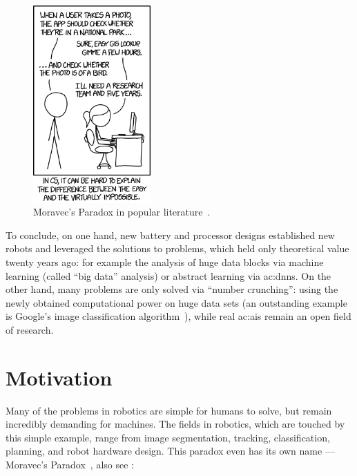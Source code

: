 \begin{figure}
  \centering
  \includegraphics[width=0.4\textwidth]{./figures/introduction/xkcd_tasks.png}
  \caption{Moravec’s Paradox in popular literature~\cite{munroe2018tasks}.}
  \label{fig:introduction_xkcdtasks}
\end{figure}

To conclude, on one hand, new battery and processor designs established new robots and leveraged the solutions to problems, which held only theoretical value twenty years ago: for example the analysis of huge data blocks via machine learning (called ``big data'' analysis) or abstract learning via \glspl{ac:dnn}.
On the other hand, many problems are only solved via ``number crunching'': using the newly obtained computational power on huge data sets (an outstanding example is Google's image classification algorithm~\cite{krizhevsky2012imagenet}), while real \glspl{ac:ai} remain an open field of research.





\section{Motivation}
\label{ssec:introduction_motivation}

Many of the problems in robotics are simple for humans to solve, but remain incredibly demanding for machines.
The fields in robotics, which are touched by this simple example, range from image segmentation, tracking, classification, planning, and robot hardware design.
This paradox even has its own name ---  Moravec’s Paradox~\cite[p. 190]{pinker2003language}, also see :

